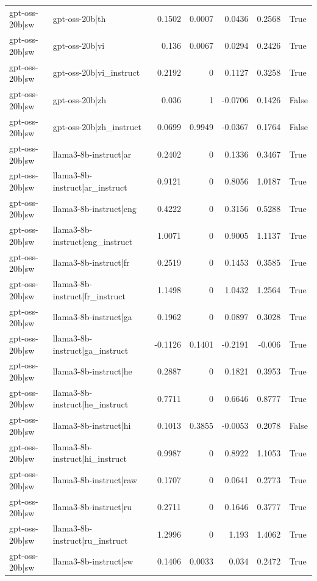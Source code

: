 \begin{table}
\begin{tabular}{l l r r r r l}
gpt-oss-20b|sw & gpt-oss-20b|th & 0.1502 & 0.0007 & 0.0436 & 0.2568 & True \\
gpt-oss-20b|sw & gpt-oss-20b|vi & 0.136 & 0.0067 & 0.0294 & 0.2426 & True \\
gpt-oss-20b|sw & gpt-oss-20b|vi_instruct & 0.2192 & 0 & 0.1127 & 0.3258 & True \\
gpt-oss-20b|sw & gpt-oss-20b|zh & 0.036 & 1 & -0.0706 & 0.1426 & False \\
gpt-oss-20b|sw & gpt-oss-20b|zh_instruct & 0.0699 & 0.9949 & -0.0367 & 0.1764 & False \\
gpt-oss-20b|sw & llama3-8b-instruct|ar & 0.2402 & 0 & 0.1336 & 0.3467 & True \\
gpt-oss-20b|sw & llama3-8b-instruct|ar_instruct & 0.9121 & 0 & 0.8056 & 1.0187 & True \\
gpt-oss-20b|sw & llama3-8b-instruct|eng & 0.4222 & 0 & 0.3156 & 0.5288 & True \\
gpt-oss-20b|sw & llama3-8b-instruct|eng_instruct & 1.0071 & 0 & 0.9005 & 1.1137 & True \\
gpt-oss-20b|sw & llama3-8b-instruct|fr & 0.2519 & 0 & 0.1453 & 0.3585 & True \\
gpt-oss-20b|sw & llama3-8b-instruct|fr_instruct & 1.1498 & 0 & 1.0432 & 1.2564 & True \\
gpt-oss-20b|sw & llama3-8b-instruct|ga & 0.1962 & 0 & 0.0897 & 0.3028 & True \\
gpt-oss-20b|sw & llama3-8b-instruct|ga_instruct & -0.1126 & 0.1401 & -0.2191 & -0.006 & True \\
gpt-oss-20b|sw & llama3-8b-instruct|he & 0.2887 & 0 & 0.1821 & 0.3953 & True \\
gpt-oss-20b|sw & llama3-8b-instruct|he_instruct & 0.7711 & 0 & 0.6646 & 0.8777 & True \\
gpt-oss-20b|sw & llama3-8b-instruct|hi & 0.1013 & 0.3855 & -0.0053 & 0.2078 & False \\
gpt-oss-20b|sw & llama3-8b-instruct|hi_instruct & 0.9987 & 0 & 0.8922 & 1.1053 & True \\
gpt-oss-20b|sw & llama3-8b-instruct|raw & 0.1707 & 0 & 0.0641 & 0.2773 & True \\
gpt-oss-20b|sw & llama3-8b-instruct|ru & 0.2711 & 0 & 0.1646 & 0.3777 & True \\
gpt-oss-20b|sw & llama3-8b-instruct|ru_instruct & 1.2996 & 0 & 1.193 & 1.4062 & True \\
gpt-oss-20b|sw & llama3-8b-instruct|sw & 0.1406 & 0.0033 & 0.034 & 0.2472 & True \\

\end{tabular}
\end{table}
